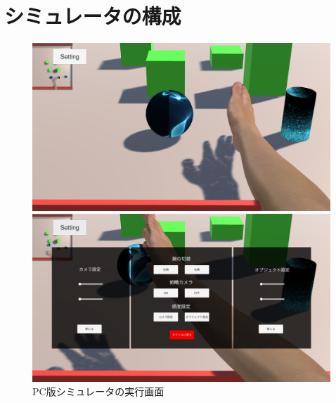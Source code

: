 \documentclass{ltjsreport}
\begin{document}
	\section{シミュレータの構成}

		\begin{figure}[H]
		\centering
		\begin{minipage}{0.75\columnwidth}
		\centering
		\includegraphics[width = \columnwidth]{../figs/PCnomal.png}
		\end{minipage}
		\hspace{0.04\columnwidth}
		\begin{minipage}{0.75\columnwidth}
		\centering
		\includegraphics[width = \columnwidth]{../figs/PCmenu.png}
		\end{minipage}
		\caption{PC版シミュレータの実行画面}
		\end{figure}
\end{document}
